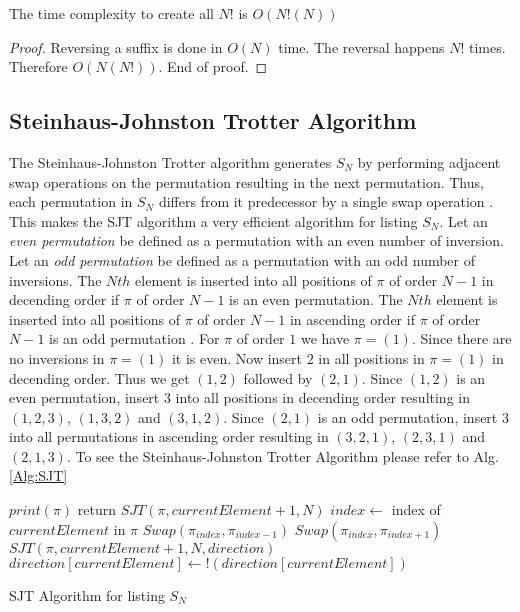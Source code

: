 \begin{lemma}
    The time complexity to create all $N!$ is $O(N!(N))$
\end{lemma}
\begin{proof}
    Reversing a suffix is done in $O(N)$ time. The reversal happens $N!$ times. Therefore $O(N(N!))$. End of proof.  
\end{proof}



\subsection{Steinhaus-Johnston Trotter Algorithm}
The Steinhaus-Johnston Trotter algorithm generates $S_{N}$ by performing adjacent swap operations 
on the permutation resulting in the next permutation. Thus, each permutation in $S_{N}$ differs 
from it predecessor by a single swap operation \cite{A25}. This makes the SJT algorithm a very efficient 
algorithm for listing $S_{N}$. Let an \emph{even permutation} be defined as a permutation 
with an even number of inversion. Let an \emph{odd permutation} be defined as a 
permutation with an odd number of inversions. The $Nth$ element is inserted into all 
positions of $\pi$ of order $N-1$ in decending order if $\pi$ of order $N-1$ is an even permutation.
The $Nth$ element is inserted into all positions of $\pi$ of order $N-1$ in ascending order if 
$\pi$ of order $N-1$ is an odd permutation \cite{A25}. For $\pi$ of order $1$ we have $\pi=(1)$. Since 
there are no inversions in $\pi=(1)$ it is even. Now insert $2$ in all positions in $\pi=(1)$
in decending order. Thus we get $(1,2)$ followed by $(2,1)$. Since $(1,2)$ is 
an even permutation, insert $3$ into all positions in decending order resulting in $(1,2,3)$,
$(1,3,2)$ and $(3,1,2)$. Since $(2,1)$ is an odd permutation, insert $3$ 
into all permutations in ascending order resulting in $(3,2,1)$, $(2,3,1)$ and $(2,1,3)$. 
To see the Steinhaus-Johnston Trotter Algorithm please refer to Alg.\ref{Alg:SJT}

\begin{algorithm}
    \begin{algorithmic}[1]
                \State $print(\pi)$
                \State return
            \EndIf
                \State $SJT(\pi, currentElement+1, N)$
                \State $index \gets $ index of $currentElement$ in $\pi$
                    \State $Swap(\pi_{index}, \pi_{index-1})$
                \Else 
                    \State $Swap(\pi_{index}, \pi_{index+1})$
                \EndIf
            \EndFor
            \State $SJT(\pi, currentElement+1, N, direction)$
            \State $direction[currentElement] \gets !(direction[currentElement])$
        \EndFunction
        
    \end{algorithmic}
    \caption{SJT Algorithm for listing $S_{N}$}
    \label{Alg:SJT}
\end{algorithm}


